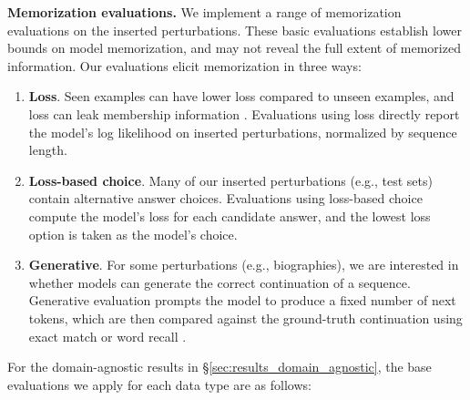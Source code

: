 \textbf{Memorization evaluations.} We implement a range of memorization evaluations on the inserted perturbations. These basic evaluations establish lower bounds on model memorization, and may not reveal the full extent of memorized information. Our evaluations elicit memorization in three ways: 
\begin{enumerate}[noitemsep,topsep=0pt]
    \item \textbf{Loss}. Seen examples can have lower loss compared to unseen examples, and loss can leak membership information \citep{shokri2017membershipinferenceattacksmachine}. Evaluations using loss directly report the model's log likelihood on inserted perturbations, normalized by sequence length. 
    \item \textbf{Loss-based choice}. Many of our inserted perturbations (e.g., test sets) contain alternative answer choices. Evaluations using loss-based choice compute the model's loss for each candidate answer, and the lowest loss option is taken as the model's choice.
    \item \textbf{Generative}. For some perturbations (e.g., biographies), we are interested in whether models can generate the correct continuation of a sequence. Generative evaluation prompts the model to produce a fixed number of next tokens, which are then compared against the ground-truth continuation using exact match or word recall \cite[metrics originally used in][]{rajpurkar-etal-2018-know}.
\end{enumerate}
For the domain-agnostic results in \S\ref{sec:results_domain_agnostic}, the base evaluations we apply for each data type are as follows:
